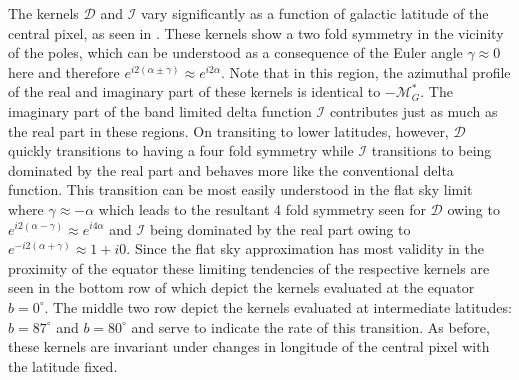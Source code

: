 %

The kernels $\mathcal{D}$ and $\mathcal{I}$ vary significantly as a function of galactic latitude of the central pixel, as seen in . These kernels show a two fold symmetry in the vicinity of the poles, which can be understood as a consequence of the Euler angle $\gamma \approx 0$ here and therefore $e^{i2(\alpha \pm \gamma)} \approx e^{i2\alpha}$. Note that in this region, the azimuthal profile of the real and imaginary part of these kernels is identical to $-\mathcal{M}^*_G$.  The imaginary part of the band limited delta function $\mathcal{I}$ contributes just as much as the real part in these regions. On transiting to lower latitudes, however, $\mathcal{D}$ quickly transitions to having a four fold symmetry while $\mathcal{I}$ transitions to being dominated by the real part and behaves more like the conventional delta function. This transition can be most easily understood in the flat sky limit where $\gamma \approx -\alpha$ which leads to the resultant 4 fold symmetry seen for $\mathcal{D}$ owing to $e^{i2(\alpha - \gamma)} \approx e^{i4\alpha}$ and $\mathcal{I}$ being dominated by the real part owing to $e^{-i2(\alpha + \gamma)} \approx 1 + i0$. Since the flat sky approximation has most validity in the proximity of the equator these limiting tendencies of the respective kernels are seen in the bottom row of  which depict the kernels evaluated at the equator $b=0^{\circ}$. The middle two row depict the kernels evaluated at intermediate latitudes: $b=87^{\circ}$ and $b=80^{\circ}$ and serve to indicate the rate of this transition. As before, these kernels are invariant under changes in longitude of the central pixel with the latitude fixed.

